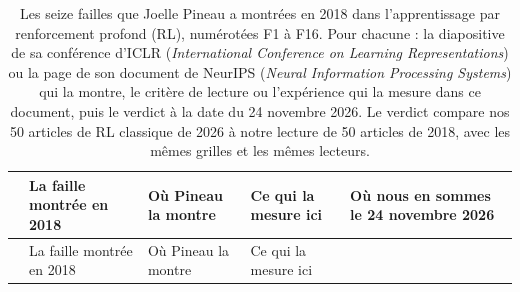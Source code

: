 \documentclass[11pt,a4paper]{article}
\begin{document}
\begin{longtable}[]{@{}
  >{\raggedright\arraybackslash}p{}
  >{\raggedright\arraybackslash}p{}
  >{\raggedright\arraybackslash}p{}
  >{\raggedright\arraybackslash}p{}
  >{\raggedright\arraybackslash}p{}@{}}
\caption{Les seize failles que Joelle Pineau a montrées en 2018 dans
l'apprentissage par renforcement profond (RL), numérotées F1 à F16. Pour
chacune : la diapositive de sa conférence d'ICLR (\emph{International
Conference on Learning Representations}) ou la page de son document de
NeurIPS (\emph{Neural Information Processing Systems}) qui la montre, le
critère de lecture ou l'expérience qui la mesure dans ce document, puis
le verdict à la date du 24 novembre 2026. Le verdict compare nos 50
articles de RL classique de 2026 à notre lecture de 50 articles de 2018,
avec les mêmes grilles et les mêmes lecteurs.}\tabularnewline
\toprule\noalign{}
\begin{minipage}[b]{\linewidth}\raggedright
\end{minipage} & \begin{minipage}[b]{\linewidth}\raggedright
La faille montrée en 2018
\end{minipage} & \begin{minipage}[b]{\linewidth}\raggedright
Où Pineau la montre
\end{minipage} & \begin{minipage}[b]{\linewidth}\raggedright
Ce qui la mesure ici
\end{minipage} & \begin{minipage}[b]{\linewidth}\raggedright
Où nous en sommes le 24 novembre 2026
\end{minipage} \\
\midrule\noalign{}
\endfirsthead
\toprule\noalign{}
\begin{minipage}[b]{\linewidth}\raggedright
\end{minipage} & \begin{minipage}[b]{\linewidth}\raggedright
La faille montrée en 2018
\end{minipage} & \begin{minipage}[b]{\linewidth}\raggedright
Où Pineau la montre
\end{minipage} & \begin{minipage}[b]{\linewidth}\raggedright
Ce qui la mesure ici
\end{minipage} & \begin{minipage}[b]{\linewidth}\raggedright

\end{minipage}
\end{longtable}
\end{document}
